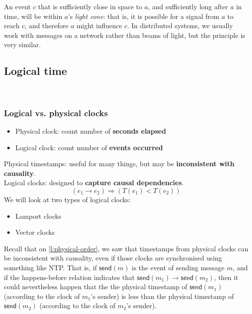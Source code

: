 An event $c$ that is sufficiently close in space to $a$, and sufficiently long after $a$ in time, will be within $a$'s \emph{light cone}: that is, it is possible for a signal from $a$ to reach $c$, and therefore $a$ might influence $c$.
In distributed systems, we usually work with messages on a network rather than beams of light, but the principle is very similar.



\subsection{Logical time}\label{sec:logical-time}

\begin{frame}
    \begin{center}
        {\Large{\color{tumblue}{Broadcast protocols and logical time}}} \\[2em]
        \mydetails
    \end{center}
\end{frame}


\begin{frame}
    \label{s:logical-clocks}
    \frametitle{Logical vs. physical clocks}
    \begin{itemize}
        \item Physical clock: count number of \textbf{seconds elapsed}
        \item Logical clock: count number of \textbf{events occurred}\\[1em]
    \end{itemize}
    Physical timestamps: useful for many things, but may be \textbf{inconsistent with causality}.\\[1em]\pause
    Logical clocks: designed to \textbf{capture causal dependencies}.
    \[ (e_1 \rightarrow e_2) \Longrightarrow (T(e_1) < T(e_2)) \]\pause
    We will look at two types of logical clocks:
    \begin{itemize}
        \item Lamport clocks
        \item Vector clocks
    \end{itemize}
\end{frame}
\label{l:logical-clocks}

Recall that on \autoref{l:physical-order}, we saw that timestamps from physical clocks can be inconsistent with causality, even if those clocks are synchronised using something like NTP.
That is, if $\mathsf{send}(m)$ is the event of sending message $m$, and if the happens-before relation indicates that $\mathsf{send}(m_1) \rightarrow \mathsf{send}(m_2)$, then it could nevertheless happen that the the physical timestamp of $\mathsf{send}(m_1)$ (according to the clock of $m_1$'s sender) is less than the physical timestamp of $\mathsf{send}(m_2)$ (according to the clock of $m_2$'s sender).

